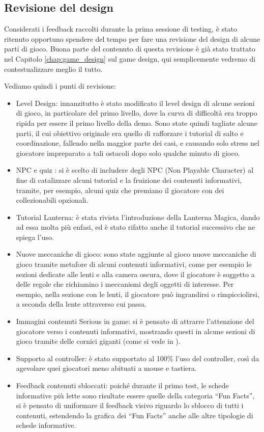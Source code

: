 \newpage


\subsection{Revisione del design}
\label{revisione}
Considerati i feedback raccolti durante la prima sessione di testing, è stato ritenuto opportuno spendere del tempo per fare una revisione del design di alcune parti di gioco.
Buona parte del contenuto di questa revisione è già stato trattato nel Capitolo \ref{chap:game_design} sul game design, qui semplicemente vedremo di contestualizzare meglio il tutto.

Vediamo quindi i punti di revisione:

\begin{itemize}

\item Level Design: innanzitutto è stato modificato il level design di alcune sezioni di gioco, in particolare del primo livello, dove la curva di difficoltà era troppo ripida per essere il primo livello della demo. Sono state quindi tagliate alcune parti, il cui obiettivo originale era quello di rafforzare i tutorial di salto e coordinazione, fallendo nella maggior parte dei casi, e causando solo stress nel giocatore impreparato a tali ostacoli dopo solo qualche minuto di gioco.
\item NPC e quiz : si è scelto di includere degli NPC (Non Playable Character) al fine di catalizzare alcuni tutorial e la fruizione dei contenuti informativi, tramite, per esempio, alcuni quiz che premiano il giocatore con dei collezionabili opzionali.
\item Tutorial Lanterna: è stata rivista l'introduzione della Lanterna Magica, dando ad essa molta più enfasi, ed è stato rifatto anche il tutorial successivo che ne spiega l'uso.
\item Nuove meccaniche di gioco: sono state aggiunte al gioco nuove meccaniche di gioco tramite metafore di alcuni contenuti informativi, come per esempio le sezioni dedicate alle lenti e alla camera oscura, dove il giocatore è soggetto a delle regole che richiamino i meccanismi degli oggetti di interesse. Per esempio, nella sezione con le lenti, il giocatore può ingrandirsi o rimpicciolirsi, a seconda della lente attraverso cui passa.
\item Immagini contenuti Serious in game: si è pensato di attrarre l'attenzione del giocatore verso i contenuti informativi, mostrando questi in alcune sezioni di gioco tramite delle cornici giganti (come si vede in \myfig{\ref{fig:cornice_serious}}).
\item Supporto al controller: è stato supportato al 100\% l'uso del controller, così da agevolare quei giocatori meno abituati a mouse e tastiera.
\item Feedback contenuti sbloccati: poiché durante il primo test, le schede informative più lette sono risultate essere quelle della categoria ``Fun Facts'', si è pensato di uniformare il feedback visivo riguardo lo sblocco di tutti i contenuti, estendendo la grafica dei ``Fun Facts'' anche alle altre tipologie di schede informative.


\end{itemize}
